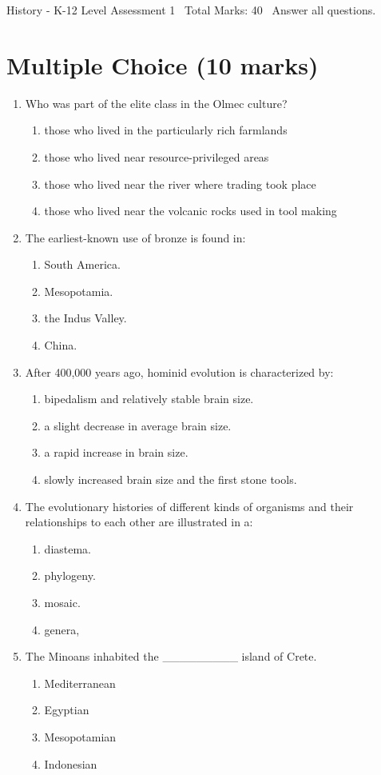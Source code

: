 \documentclass[12pt]{article}
\begin{document}
\begin{center}
History - K-12 Level Assessment 1 \
Total Marks: 40 \
Answer all questions.
\end{center}

\section*{Multiple Choice (10 marks)}
\begin{enumerate}[label=\arabic*.]
\item Who was part of the elite class in the Olmec culture?
\begin{enumerate}[label=(\alph*)]
    \item those who lived in the particularly rich farmlands
    \item those who lived near resource-privileged areas
    \item those who lived near the river where trading took place
    \item those who lived near the volcanic rocks used in tool making
\end{enumerate}
\item The earliest-known use of bronze is found in:
\begin{enumerate}[label=(\alph*)]
    \item South America.
    \item Mesopotamia.
    \item the Indus Valley.
    \item China.
\end{enumerate}
\item After 400,000 years ago, hominid evolution is characterized by:
\begin{enumerate}[label=(\alph*)]
    \item bipedalism and relatively stable brain size.
    \item a slight decrease in average brain size.
    \item a rapid increase in brain size.
    \item slowly increased brain size and the first stone tools.
\end{enumerate}
\item The evolutionary histories of different kinds of organisms and their relationships to each
other are illustrated in a:
\begin{enumerate}[label=(\alph*)]
    \item diastema.
    \item phylogeny.
    \item mosaic.
    \item genera,
\end{enumerate}
\item The Minoans inhabited the \_\_\_\_\_\_\_\_\_ island of Crete.
\begin{enumerate}[label=(\alph*)]
    \item Mediterranean
    \item Egyptian
    \item Mesopotamian
    \item Indonesian
\end{enumerate}
\end{enumerate}
\end{document}

